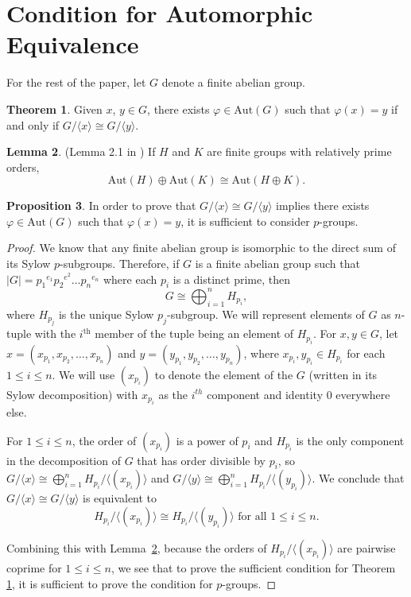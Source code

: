 \documentclass[11pt]{amsart}
\theoremstyle{definition}
\newtheorem{lem}{Lemma}[section]
\newtheorem{prop}[lem]{Proposition}
\newtheorem{thm}[lem]{Theorem}
\renewcommand{\phi}{\varphi}
\newcommand{\Aut}{\text{Aut}}
\newcommand{\setx}{\langle x \rangle}
\newcommand{\sety}{\langle y \rangle}
\renewcommand{\leq}{\leqslant}
\numberwithin{equation}{section}
\begin{document}
\section{Condition for Automorphic Equivalence}
For the rest of the paper, let $G$ denote a finite abelian group. 
\begin{thm}\label{mainres}
    Given $x$, $y \in G$, there exists $\phi \in \Aut(G)$ such that $\phi(x) = y$ if and only if $G/\setx \cong G/\sety$. 
\end{thm}

\begin{lem}\label{lemmaprod}
(Lemma 2.1 in \cite{hillar})
If $H$ and $K$ are finite groups with relatively prime orders, 
$$
\Aut(H) \oplus \Aut(K) \cong \Aut(H \oplus K). 
$$
\end{lem}

\begin{prop}\label{prop:pgroup}
    In order to prove that $G/\setx \cong G/\sety$ implies there exists $\phi \in \Aut(G)$ such that $\phi(x) = y$, it is sufficient to consider $p$-groups. 
\end{prop}
\begin{proof}
We know that any finite abelian group is isomorphic to the direct sum of its
Sylow $p$-subgroups. Therefore, if $G$ is a finite abelian group such that $|G| = {p_1}^{e_1}{p_2}^{e^2}\dots{p_n}^{e_n}$ where each $p_i$ is a distinct prime, then 
$$
G \cong \bigoplus_{i=1}^n H_{p_i},
$$
where $H_{p_j}$ is the unique Sylow $p_j$-subgroup.
We will represent elements of $G$ as $n$-tuple with the $i^\text{th}$ member of the tuple being an element of $H_{p_i}$. 
For $x,y \in G$,
let $x = (x_{p_1},x_{p_2},\dots,x_{p_n})$ and
$y = (y_{p_1},y_{p_2},\dots,y_{p_n})$, where $x_{p_i}, y_{p_i} \in H_{p_i}$ for each $1 \leq i \leq n$.
We will use $(x_{p_i})$ to denote the element of the $G$ (written in its Sylow decomposition) with $x_{p_i}$ as the $i^{th}$ component and identity $0$ everywhere else. 

For $1 \leq i \leq n$, the order of $(x_{p_i})$ is a power of $p_i$ and $H_{p_i}$ is the only component in the decomposition of $G$ that has order divisible by $p_i$, so
$G/\langle x \rangle \cong \bigoplus_{i=1}^n H_{p_i} /\langle (x_{p_i}) \rangle $ and $G/\langle y \rangle \cong \bigoplus_{i=1}^n H_{p_i} /\langle (y_{p_i}) \rangle $. We conclude that
$G/\langle x \rangle \cong G/\langle y \rangle  $ 
is equivalent to \[H_{p_i} /\langle (x_{p_i})\rangle \cong H_{p_i} / \langle (y_{p_i}) \rangle \text{ for all } 1 \leq i \leq n.\]

Combining this with Lemma~\ref{lemmaprod}, because the orders of $H_{p_i}/\langle (x_{p_i})\rangle$ are pairwise coprime for $1 \leq i \leq n$, we see that to prove the sufficient condition for Theorem \ref{mainres}, it is sufficient to prove the condition for $p$-groups. 
\end{proof}
\end{document}
